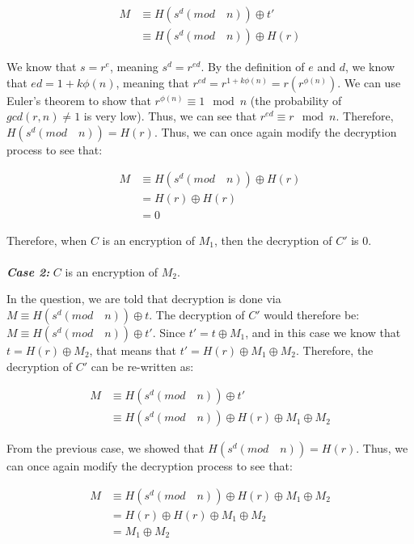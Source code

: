 \documentclass[11pt]{article}
\theoremstyle{definition}
\begin{document}
\begin{enumerate}
    \begin{align*}
        M &\equiv H(s^d (mod \quad n)) \oplus t' \\
        &\equiv H(s^d (mod \quad n)) \oplus H(r)
    \end{align*}
    
    We know that $s = r^e$, meaning $s^d = r^{ed}$. By the definition of $e$ and $d$, we know that $ed = 1 + k\phi{(n)}$, meaning that $r^{ed} = r^{1 + k\phi{(n)}} = r (r^{\phi{(n)}})$. We can use Euler's theorem to show that $r^{\phi{(n)}} \equiv 1 \mod{n}$ (the probability of $gcd(r, n) \neq 1$ is very low). Thus, we can see that $r^{ed} \equiv r \mod{n}$. Therefore, $H(s^d (mod \quad n)) = H(r)$. Thus, we can once again modify the decryption process to see that:
    
    \begin{align*}
        M &\equiv H(s^d (mod \quad n)) \oplus H(r) \\
        &= H(r) \oplus H(r) \\
        &= 0
    \end{align*}
    
    Therefore, when $C$ is an encryption of $M_1$, then the decryption of $C'$ is 0. \\ \\
    
    
    \textbf{\textit{Case 2:}} $C$ is an encryption of $M_2$.
    
    In the question, we are told that decryption is done via $M \equiv H(s^d (mod \quad n)) \oplus t$. The decryption of $C'$ would therefore be: $M \equiv H(s^d (mod \quad n)) \oplus t'$. Since $t' = t \oplus M_1$, and in this case we know that $t = H(r) \oplus M_2$, that means that $t' = H(r) \oplus M_1 \oplus M_2$. Therefore, the decryption of $C'$ can be re-written as: 
    
    \begin{align*}
        M &\equiv H(s^d (mod \quad n)) \oplus t' \\
        &\equiv H(s^d (mod \quad n)) \oplus H(r) \oplus M_1 \oplus M_2
    \end{align*}
    
    From the previous case, we showed that $H(s^d (mod \quad n)) = H(r)$. Thus, we can once again modify the decryption process to see that:
    
    \begin{align*}
        M &\equiv H(s^d (mod \quad n)) \oplus H(r) \oplus M_1 \oplus M_2 \\
        &= H(r) \oplus H(r) \oplus M_1 \oplus M_2 \\
        &= M_1 \oplus M_2
    \end{align*}
    

\end{enumerate}
\end{document}

